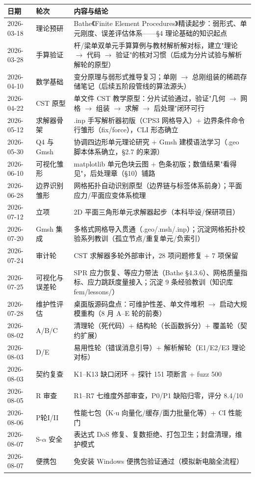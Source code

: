 \documentclass[12pt,a4paper]{ctexart}
\begin{document}
\begin{longtable}{p{2.8cm}p{5.1cm}p{6.7cm}}
\toprule
\textbf{日期} & \textbf{轮次} & \textbf{内容与结论} \\
\midrule
2026-03-18 & 理论预研 & Bathe《Finite Element Procedures》精读起步：弱形式、单元刚度、误差评估体系——§4 理论基础的知识起点 \\
2026-03-28 & 手算验证 & 杆/梁单双单元手算算例与教材解析解对标，建立"理论 $\rightarrow$ 代码 $\rightarrow$ 验证"的核对习惯（后成为分片试验与解析解轮的原型） \\
2026-04-10 & 数学基础 & 变分原理与弱形式推导复习；单刚 $\rightarrow$ 总刚组装的稀疏存储笔记（后续五阶段管线的算法源头） \\
2026-04-22 & CST 原型 & 单文件 CST 教学原型：分片试验通过，验证"几何 $\rightarrow$ 网格 $\rightarrow$ 组装 $\rightarrow$ 求解 $\rightarrow$ 后处理"闭环可行 \\
2026-05-12 & 求解器骨架 & .inp 手写解析器初版（CPS3 网格导入）+ 边界条件命令行雏形（fix/force），CLI 形态确立 \\
2026-05-30 & Q4 与 Gmsh & 协调四边形单元理论研究 + Gmsh 建模语法学习（.geo 脚本体系确立，§2.7 的来源） \\
2026-06-10 & 可视化雏形 & matplotlib 单元色块云图 + 色条初版；数值结果"看得见"，后处理章（§10）铺路 \\
2026-06-28 & 边界识别雏形 & 网格拓扑自动识别原型（边界链与标签体系前身）；平面应力/平面应变体系梳理 \\
2026-07-12 & 立项 & 2D 平面三角形单元求解器起步（本科毕设/保研项目） \\
2026-07-20 & Gmsh 集成 & 多格式网格导入贯通（.geo/.msh/.inp）；沉淀网格拓扑校验系列教训（孤立节点/重复单元/负索引） \\
2026-07-24 & 审计轮 & CST 求解器多轮外部审计，28 项问题修复 + 7 项保留 \\
2026-07-25 & 可视化与误差轮 & SPR 应力恢复、等应力带法（Bathe §4.3.6）、网格质量指标、应力跳跃度量接入；沉淀 9 条经验教训（知识库 fem/lessons/） \\
2026-07-28 & 维护性评估 & 桌面版源码盘点：可维护性差、单文件堆积 $\rightarrow$ 启动大规模重构（8 月 A--E 轮的前奏） \\
2026-08-02 & A/B/C & 清理轮（死代码）+ 结构轮（长函数拆分）+ 覆盖轮（契约扩展） \\
2026-08-03 & D/E & 易用性轮（错误消息引导）+ 解析解轮（E1/E2/E3 理论对标） \\
2026-08-03 & 契约复查 & K1--K13 缺口闭环 + 探针 151 项断言 + fuzz 500 \\
2026-08-05 & R 审查 & R1--R7 七维度外部审查，P0/P1 缺陷归零，评分 8.4/10 \\
2026-08-06 & P轮I/II & 性能七包（K$\cdot$u 向量化/缓存/面力批量化等）+ CI 性能门 \\
2026-08-07 & S-$\alpha$ 安全 & 表达式 DoS 修复、复数拒绝、打包卫生；封盘清理，维护模式 \\
2026-08-07 & 便携包 & 免安装 Windows 便携包验证通过（模拟新电脑全流程） \\
\bottomrule
\end{longtable}
\end{document}
